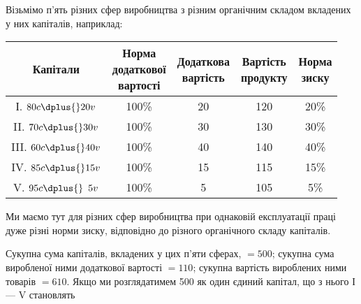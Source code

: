 Візьмімо п’ять різних сфер виробництва з різним органічним
складом вкладених у них капіталів, наприклад:
  \begin{center}
  \begin{tabular}{c c c c c}
  \toprule
Капітали  &  \makecell{Норма\\додаткової\\вартості}  & \makecell{Додаткова \\вартість} & \makecell{Вартість\\продукту} & \makecell{Норма\\зиску}\\
  \midrule
\phantom{II}І. $80 c \dplus{} 20 v$          &  100\% &   20            &  120 &   20\% \\
\phantom{I}II. $70 c \dplus{} 30 v$          &  100\% &   30            &  130 &   30\% \\
III. $60 c \dplus{} 40 v$                    &  100\% &   40            &  140 &   40\% \\
IV. $85 c \dplus{} 15 v$                     &  100\% &   15            &  115 &   15\% \\
\phantom{I}V. $95 c \dplus{} \phantom{0}5 v$ &  100\% &   \phantom{0}5  &  105 &   \phantom{0}5\% \\
  \end{tabular}
  \end{center}

Ми маємо тут для різних сфер виробництва при однаковій
експлуатації праці дуже різні норми зиску, відповідно до різного органічного складу капіталів.

Сукупна сума капіталів, вкладених у цих п’яти сферах, $= 500$;
сукупна сума виробленої ними додаткової вартості $= 110$; сукупна вартість вироблених ними товарів $=
610$. Якщо ми розглядатимем 500 як один єдиний капітал, що з нього І — V становлять
\parbreak{}  %

